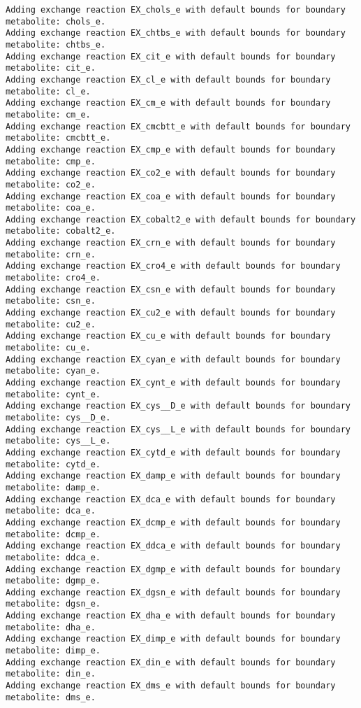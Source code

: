 \documentclass[
  letterpaper,
  DIV=11,
  numbers=noendperiod]{scrartcl}
\begin{document}
\begin{verbatim}
Adding exchange reaction EX_chols_e with default bounds for boundary metabolite: chols_e.
Adding exchange reaction EX_chtbs_e with default bounds for boundary metabolite: chtbs_e.
Adding exchange reaction EX_cit_e with default bounds for boundary metabolite: cit_e.
Adding exchange reaction EX_cl_e with default bounds for boundary metabolite: cl_e.
Adding exchange reaction EX_cm_e with default bounds for boundary metabolite: cm_e.
Adding exchange reaction EX_cmcbtt_e with default bounds for boundary metabolite: cmcbtt_e.
Adding exchange reaction EX_cmp_e with default bounds for boundary metabolite: cmp_e.
Adding exchange reaction EX_co2_e with default bounds for boundary metabolite: co2_e.
Adding exchange reaction EX_coa_e with default bounds for boundary metabolite: coa_e.
Adding exchange reaction EX_cobalt2_e with default bounds for boundary metabolite: cobalt2_e.
Adding exchange reaction EX_crn_e with default bounds for boundary metabolite: crn_e.
Adding exchange reaction EX_cro4_e with default bounds for boundary metabolite: cro4_e.
Adding exchange reaction EX_csn_e with default bounds for boundary metabolite: csn_e.
Adding exchange reaction EX_cu2_e with default bounds for boundary metabolite: cu2_e.
Adding exchange reaction EX_cu_e with default bounds for boundary metabolite: cu_e.
Adding exchange reaction EX_cyan_e with default bounds for boundary metabolite: cyan_e.
Adding exchange reaction EX_cynt_e with default bounds for boundary metabolite: cynt_e.
Adding exchange reaction EX_cys__D_e with default bounds for boundary metabolite: cys__D_e.
Adding exchange reaction EX_cys__L_e with default bounds for boundary metabolite: cys__L_e.
Adding exchange reaction EX_cytd_e with default bounds for boundary metabolite: cytd_e.
Adding exchange reaction EX_damp_e with default bounds for boundary metabolite: damp_e.
Adding exchange reaction EX_dca_e with default bounds for boundary metabolite: dca_e.
Adding exchange reaction EX_dcmp_e with default bounds for boundary metabolite: dcmp_e.
Adding exchange reaction EX_ddca_e with default bounds for boundary metabolite: ddca_e.
Adding exchange reaction EX_dgmp_e with default bounds for boundary metabolite: dgmp_e.
Adding exchange reaction EX_dgsn_e with default bounds for boundary metabolite: dgsn_e.
Adding exchange reaction EX_dha_e with default bounds for boundary metabolite: dha_e.
Adding exchange reaction EX_dimp_e with default bounds for boundary metabolite: dimp_e.
Adding exchange reaction EX_din_e with default bounds for boundary metabolite: din_e.
Adding exchange reaction EX_dms_e with default bounds for boundary metabolite: dms_e.

\end{verbatim}
\end{document}
